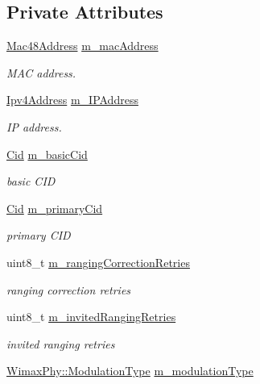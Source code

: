 \subsection*{Private Attributes}
\begin{DoxyCompactItemize}
\item 
\hyperlink{classns3_1_1Mac48Address}{Mac48\+Address} \hyperlink{classns3_1_1SSRecord_a1eb3631f2852437bcbae46dab572efef}{m\+\_\+mac\+Address}
\begin{DoxyCompactList}\small\item\em M\+AC address. \end{DoxyCompactList}\item 
\hyperlink{classns3_1_1Ipv4Address}{Ipv4\+Address} \hyperlink{classns3_1_1SSRecord_a0ff0f392bf573003497d900d3fac0185}{m\+\_\+\+I\+P\+Address}
\begin{DoxyCompactList}\small\item\em IP address. \end{DoxyCompactList}\item 
\hyperlink{classns3_1_1Cid}{Cid} \hyperlink{classns3_1_1SSRecord_a49579cf90e40b20a179b7d55846b9b82}{m\+\_\+basic\+Cid}
\begin{DoxyCompactList}\small\item\em basic C\+ID \end{DoxyCompactList}\item 
\hyperlink{classns3_1_1Cid}{Cid} \hyperlink{classns3_1_1SSRecord_aadd3be13d83cd0748c1e960e6384470c}{m\+\_\+primary\+Cid}
\begin{DoxyCompactList}\small\item\em primary C\+ID \end{DoxyCompactList}\item 
uint8\+\_\+t \hyperlink{classns3_1_1SSRecord_ae3dbee9e71d6b5dcd01f0797bc4705dd}{m\+\_\+ranging\+Correction\+Retries}
\begin{DoxyCompactList}\small\item\em ranging correction retries \end{DoxyCompactList}\item 
uint8\+\_\+t \hyperlink{classns3_1_1SSRecord_aa13808d81f2f4bd402e3bcb197f894c4}{m\+\_\+invited\+Ranging\+Retries}
\begin{DoxyCompactList}\small\item\em invited ranging retries \end{DoxyCompactList}\item 
\hyperlink{classns3_1_1WimaxPhy_a044c5d8a48ca992c39c2a946f6e755fa}{Wimax\+Phy\+::\+Modulation\+Type} \hyperlink{classns3_1_1SSRecord_aa212c1ab625a302277d92bbed0fcd577}{m\+\_\+modulation\+Type}

\end{DoxyCompactItemize}
